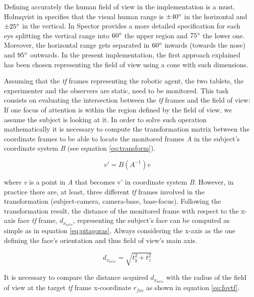 \documentclass{sig-alternate}
\begin{document}
Defining accurately the human field of view in the implementation is a must. Holmqvist in \cite{holmqvist2011eye} specifies that the visual human range is $ \pm  40\degree $ in the horizontal and $ \pm 25\degree $ in the vertical. In \cite{walker1980clinical} Spector provides a more detailed specification for each eye splitting the vertical range into $ 60\degree $ the upper region and $ 75\degree $ the lower one. Moreover, the horizontal range gets separated in $ 60\degree $ inwards (towards the nose) and $ 95\degree $ outwards. In the present implementation, the first approach explained has been chosen representing the field of view using a cone with such dimensions.

Assuming that the \textit{tf} frames representing the robotic agent, the two tablets, the experimenter and the observers are static, need to be monitored. This task consists on evaluating the intersection between the \textit{tf} frames and the field of view: If one focus of attention is within the region defined by the field of view, we assume the subject is looking at it. In order to solve such operation mathematically it is necessary to compute the transformation matrix between the coordinate frames to be able to locate the monitored frames \textit{A} in the subject's coordinate system \textit{B} (see equation \ref{eq:transform}).

\begin{equation}
v' = B(A^{-1})v
\label{eq:transform}
\end{equation}

where \textit{v} is a point in \textit{A} that becomes v' in coordinate system \textit{B}. However, in practice there are, at least, three different \textit{tf} frames involved in the transformation (subject-camera, camera-base, base-focus). Following the transformation result, the distance of the monitored frame with respect to the x-axis face \textit{tf} frame, $ d_{x_{axis}} $, representing the subject's face can be computed as simple as in equation \ref{eq:pitagoras}. Always considering the x-axis as the one defining the face's orientation and thus field of view's main axis.

\begin{equation}
d_{x_{axis}} = \sqrt{t_y^2 + t_z^2}
\label{eq:pitagoras}
\end{equation}

It is necessary to compare the distance acquired $ d_{x_{axis}} $ with the radius of the field of view at the target \textit{tf} frame x-coordinate $ r_{fov} $ as shown in equation \ref{eq:fovtf}.
\end{document}
